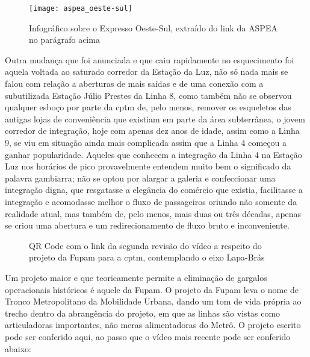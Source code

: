 \documentclass[11pt,fleqn]{book} %
\begin{document}
\begin{figure}[!htb]
	\caption[Diagrama do Expresso Oeste-Sul]{Infográfico sobre o Expresso Oeste-Sul, extraído do link da ASPEA no parágrafo acima}
	\centering
	\texttt{[image: aspea\_oeste-sul]}
	\label{fig:aspea_oeste-sul}
\end{figure}

Outra mudança que foi anunciada e que caiu rapidamente no esquecimento foi aquela voltada ao saturado corredor da Estação da Luz, não só nada mais se falou com relação a aberturas de mais saídas e de uma conexão com a subutilizada Estação Júlio Prestes da Linha 8, como também não se observou qualquer esboço por parte da \gls{cptm} de, pelo menos, remover os esqueletos das antigas lojas de conveniência que existiam em parte da área subterrânea, o jovem corredor de integração, hoje com apenas dez anos de idade, assim como a Linha 9, se viu em situação ainda mais complicada assim que a Linha 4 começou a ganhar popularidade. Aqueles que conhecem a integração da Linha 4 na Estação Luz nos horários de pico provavelmente entendem muito bem o significado da palavra gambiarra; não se optou por alargar a galeria e confeccionar uma integração digna, que resgatasse a elegância do comércio que existia, facilitasse a integração e acomodasse melhor o fluxo de passageiros oriundo não somente da realidade atual, mas também de, pelo menos, mais duas ou três décadas, apenas se criou uma abertura e um redirecionamento de fluxo bruto e inconveniente.

\begin{wrapfigure}{l}{0.5\textwidth}
	\centering
	\caption[QR Code com renders do eixo Lapa-Brás pela Fupam]{QR Code com o link da segunda revisão do vídeo a respeito do projeto da Fupam para a \gls{cptm}, contemplando o eixo Lapa-Brás}
	\label{qr:video_fupam}
\end{wrapfigure}

Um projeto maior e que teoricamente permite a eliminação de gargalos operacionais históricos é aquele da Fupam. O projeto da Fupam leva o nome de Tronco Metropolitano da Mobilidade Urbana, dando um tom de vida própria ao trecho dentro da abrangência do projeto, em que as linhas são vistas como articuladoras importantes, não meras alimentadoras do Metrô. O projeto escrito pode ser conferido aqui, ao passo que o vídeo mais recente pode ser conferido abaixo:
\end{document}
